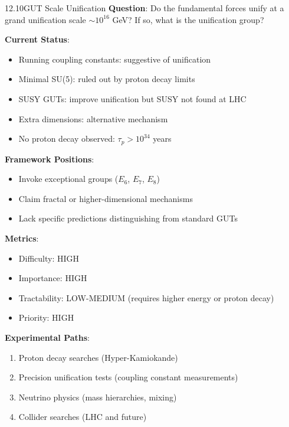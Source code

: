 \begin{openproblem}{12.10}{GUT Scale Unification}
\textbf{Question}: Do the fundamental forces unify at a grand unification scale $\sim 10^{16}$ GeV? If so, what is the unification group?

\textbf{Current Status}:
\begin{itemize}
    \item Running coupling constants: suggestive of unification
    \item Minimal SU(5): ruled out by proton decay limits
    \item SUSY GUTs: improve unification but SUSY not found at LHC
    \item Extra dimensions: alternative mechanism
    \item No proton decay observed: $\tau_p > 10^{34}$ years
\end{itemize}

\textbf{Framework Positions}:
\begin{itemize}
    \item Invoke exceptional groups ($E_6$, $E_7$, $E_8$)
    \item Claim fractal or higher-dimensional mechanisms
    \item Lack specific predictions distinguishing from standard GUTs
\end{itemize}

\textbf{Metrics}:
\begin{itemize}
    \item Difficulty: HIGH
    \item Importance: HIGH
    \item Tractability: LOW-MEDIUM (requires higher energy or proton decay)
    \item Priority: HIGH
\end{itemize}

\textbf{Experimental Paths}:
\begin{enumerate}
    \item Proton decay searches (Hyper-Kamiokande)
    \item Precision unification tests (coupling constant measurements)
    \item Neutrino physics (mass hierarchies, mixing)
    \item Collider searches (LHC and future)
\end{enumerate}
\end{openproblem}

